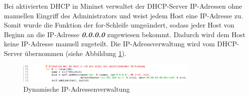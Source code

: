 \documentclass[fontsize=12pt,paper=a4,open=any,parskip=half,
  twoside=false,toc=listof,toc=bibliography,fleqn,leqno,
  captions=nooneline,captions=tableabove,british]{scrbook}
\begin{document}
Bei aktivierten DHCP in Mininet verwaltet der DHCP-Server IP-Adressen ohne manuellen Eingriff des Administrators und weist jedem Host eine IP-Adresse zu. Somit wurde die Funktion der for-Schleife umgeändert, sodass jeder Host von Beginn an die IP-Adresse \textit{\textbf{0.0.0.0}} zugewiesen bekommt. Dadurch wird dem Host keine IP-Adresse manuell zugeteilt. Die IP-Adressverwaltung wird vom DHCP-Server übernommen (siehe Abbildung \ref{forneu}).
  
\begin{figure}[H]
 \centering
 \includegraphics[width=0.8\textwidth]{Bilder/forneu}
 \captionsetup{justification=centering}
 \caption{Dynamische IP-Adressenverwaltung}
 \label{forneu}
\end{figure}

\newpage
\end{document}
